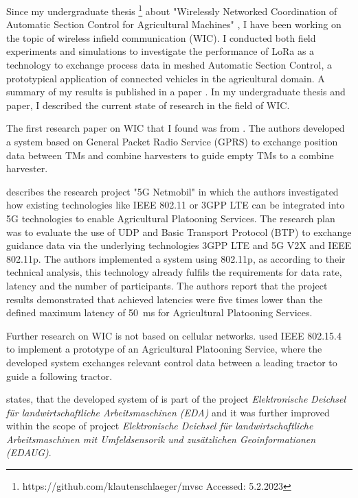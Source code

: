 Since my undergraduate thesis \footnote{https://github.com/klautenschlaeger/mvsc Accessed: 5.2.2023} about "Wirelessly Networked Coordination of Automatic Section Control for Agricultural Machines"
, I have been working on the topic of wireless infield communication (WIC). I conducted both field experiments and
simulations to investigate the performance of LoRa as a technology to exchange process data in
meshed Automatic Section Control, a prototypical application of connected vehicles in the agricultural domain.
A summary of my results is published in a paper \cite{lautenschlaeger_beyond_2022}.
In my undergraduate thesis and paper, I described the current state of research in the field of WIC.

The first research paper on WIC that I found was from \textcite{ali_multi-agent_2010}. The authors
developed a system based on General Packet Radio Service (GPRS) to exchange position data between \ac{TM}s and combine
harvesters to guide empty \ac{TM}s to a combine harvester.

\textcite{smolnik_5g_2020} describes the research project "5G Netmobil" in which the authors investigated how existing technologies like
IEEE 802.11 or 3GPP LTE can be integrated into 5G technologies to enable Agricultural Platooning Services. The research plan was to evaluate the use of \ac{UDP} and Basic Transport Protocol (BTP) to exchange guidance data via
the underlying technologies 3GPP LTE and 5G V2X and IEEE 802.11p. The authors implemented a system using 802.11p,
as according to their technical analysis, this technology already fulfils the requirements for data rate, latency
and the number of participants. The authors report that the project results demonstrated that achieved
latencies were five times lower than the defined maximum latency of \SI{50}{\milli\second} for Agricultural Platooning Services.

Further research on \ac{WIC} is not based on cellular networks. \cite{zhang_method_2009} used IEEE 802.15.4 to implement a
prototype of an Agricultural Platooning Service, where the developed system exchanges relevant control data between a leading tractor
to guide a following tractor.

\textcite{smolnik_5g_2020} states, that the developed system of \textcite{zhang_method_2009} is part
of the project \textit{Elektronische Deichsel für landwirtschaftliche Arbeitsmaschinen (EDA)}
and it was further improved within the scope of project \textit{Elektronische Deichsel für landwirtschaftliche Arbeitsmaschinen mit Umfeldsensorik und zusätzlichen Geoinformationen (EDAUG)}.


